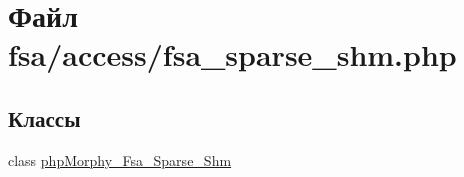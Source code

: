 \hypertarget{fsa__sparse__shm_8php}{
\section{Файл fsa/access/fsa\_\-sparse\_\-shm.php}
\label{fsa__sparse__shm_8php}
}
\subsection*{Классы}
\begin{DoxyCompactItemize}
\item 
class \hyperlink{classphpMorphy__Fsa__Sparse__Shm}{phpMorphy\_\-Fsa\_\-Sparse\_\-Shm}
\end{DoxyCompactItemize}
